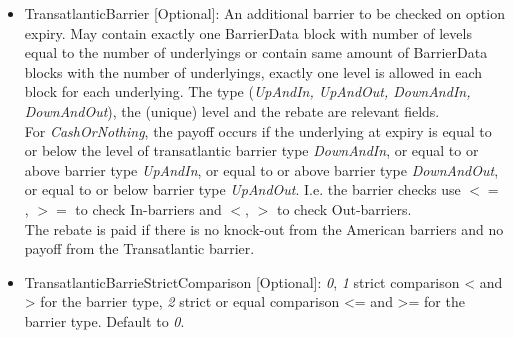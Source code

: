 \begin{itemize}
\item TransatlanticBarrier [Optional]: An additional barrier to be checked on option expiry. May contain exactly one
  BarrierData block with number of levels equal to the number of underlyings or contain same amount of BarrierData blocks with
  the number of underlyings, exactly one level is allowed in each block for each underlying. The type (\emph{UpAndIn, UpAndOut, DownAndIn, DownAndOut}), the (unique) level and the rebate are relevant fields. \\
  For  \emph{CashOrNothing}, the payoff occurs if the underlying at expiry is equal to or below the level of transatlantic barrier type \emph{DownAndIn}, or equal to or above  barrier type \emph{UpAndIn}, or equal to or above barrier type \emph{DownAndOut}, or equal to or below barrier type \emph{UpAndOut}. I.e. the barrier checks use $<=$, $>=$ to check In-barriers and $<$, $>$ to check Out-barriers. \\
  The rebate is paid if there is no knock-out from the American barriers and no payoff from the Transatlantic barrier. 
\item TransatlanticBarrieStrictComparison [Optional]: \emph{0}, \emph{1} strict comparison < and > for the barrier type, \emph{2} strict or equal comparison <= and >= for the barrier type. Default to \emph{0}.\\

\end{itemize}

